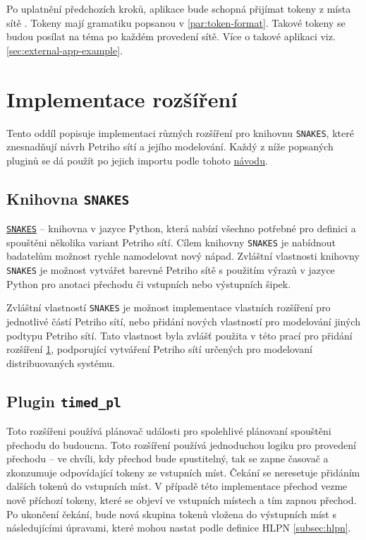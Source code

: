 Po uplatnění předchozích kroků, aplikace bude schopná přijímat tokeny z místa  sítě . Tokeny mají gramatiku popsanou v \ref{par:token-format}. Takové tokeny se budou posílat na téma  po každém provedení sítě. Více o takové aplikaci viz. \ref{sec:external-app-example}.

\section{Implementace rozšíření}
\label{sec:plug-impl}
Tento oddíl popisuje implementaci různých rozšíření pro knihovnu \texttt{SNAKES}, které znesnadňují návrh Petriho sítí a jejího modelování. Každý z níže popsaných pluginů se dá použít po jejich importu podle tohoto \href{https://www.ibisc.univ-evry.fr/~fpommereau/SNAKES/first-steps-with-snakes.html}{návodu}.

\subsection{Knihovna \texttt{SNAKES}}

\href{https://www.ibisc.univ-evry.fr/~fpommereau/SNAKES/}{\texttt{SNAKES}} -- knihovna v jazyce Python, která nabízí všechno potřebné pro definici a spouštěni několika variant Petriho sítí. Cílem knihovny \texttt{SNAKES} je nabídnout badatelům možnost rychle namodelovat nový nápad. Zvláštní vlastnosti knihovny \texttt{SNAKES} je možnost vytvářet barevné Petriho sítě s použitím výrazů v jazyce Python pro anotaci přechodu či vstupních nebo výstupních šipek. \cite{snakes}

Zvláštní vlastností \texttt{SNAKES} je možnost implementace vlastních rozšíření pro jednotlivé částí Petriho sítí, nebo přidání nových vlastností pro modelování jiných podtypu Petriho sítí. Tato vlastnost byla zvlášť použita v této prací pro přidání rozšíření \ref{sec:plug-impl}, podporující vytváření Petriho sítí určených pro modelovaní distribuovaných systému.

\subsection{Plugin \texttt{timed\_pl}}
\label{subsec:timed_pl}
Toto rozšířeni používá plánovač události pro spolehlivé plánovaní spouštěni přechodu do budoucna. Toto rozšíření používá jednoduchou logiku pro provedení přechodu -- ve chvíli, kdy přechod bude spustitelný, tak se zapne časovač a zkonzumuje odpovídající tokeny ze vstupních míst. Čekání se neresetuje přidáním dalších tokenů do vstupních míst. V případě této implementace přechod vezme nově příchozí tokeny, které se objeví ve vstupních místech a tím zapnou přechod. Po ukončení čekání, bude nová skupina tokenů vložena do výstupních míst s následujícími úpravami, které mohou nastat podle definice HLPN \ref{subsec:hlpn}.


